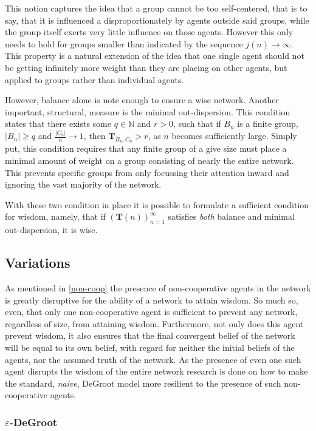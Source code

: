 \documentclass{article}
\newcommand{\T}{\textbf{T}}
\newcommand{\Soc}{(\T(n))^{\infty}_{n=1}}
\begin{document}
This notion captures the idea that a group cannot be too self-centered, that is to say, that it is influenced a disproportionately by agents outside said groups, while the group itself exerts very little influence on those agents. However this only needs to hold for groups smaller than indicated by the sequence $j(n) \to\infty$.
This property is a natural extension of the idea that one single agent should not be getting infinitely more weight than they are placing on other agents, but applied to groups rather than individual agents. \newline

However, balance alone is note enough to ensure a wise network. Another important, structural, measure is the minimal out-dispersion. This condition states that there exists some $q\in \mathbb{N}$ and $r > 0$, such that if $B_n$ is a finite group, $|B_n|\geq q$ and $\frac{|C_n|}{n}\to 1$, then $\textbf{T}_{B_n, C_n} > r$, as $n$ becomes sufficiently large. Simply put, this condition requires that any finite group of a give size must place a minimal amount of weight on a group consisting of nearly the entire network. This prevents specific groups from only focussing their attention inward and ignoring the vast majority of the network.

With these two condition in place it is possible to formulate a sufficient condition for wisdom, namely, that if $\Soc$ satisfies \emph{both} balance and minimal out-dispersion, it is wise.

\subsection{Variations}
As mentioned in \ref{non-coop} the presence of non-cooperative agents in the network is greatly disruptive for the ability of a network to attain wisdom. So much so, even, that only one non-cooperative agent is sufficient to prevent any network, regardless of size, from attaining wisdom. Furthermore, not only does this agent prevent wisdom, it also ensures that the final convergent belief of the network will be equal to its own belief, with regard for neither the initial beliefs of the agents, nor the assumed truth of the network. As the presence of even one such agent disrupts the wisdom of the entire network research is done on how to make the standard, \emph{naive}, DeGroot model more resilient to the presence of such non-cooperative agents.

\subsubsection{$\varepsilon$-DeGroot}
\end{document}
